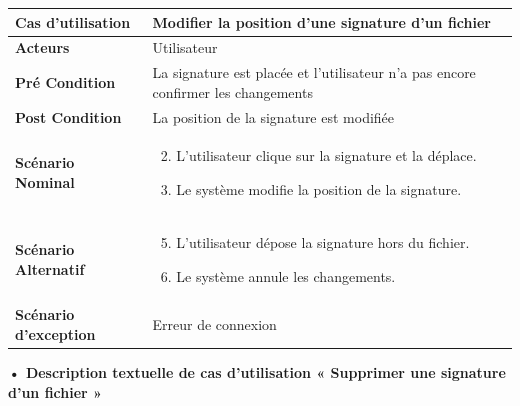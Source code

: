 \begin{longtable}{|p{5cm}|p{10cm}|}
\hline
\textbf{Cas d'utilisation}&Modifier la position d'une signature d'un fichier\\
\hline
\textbf{Acteurs}&Utilisateur\\
\hline
\textbf{Pré Condition}&La signature est placée et l'utilisateur n'a pas encore confirmer les changements\\
\hline
\textbf{Post Condition}&La position de la signature est modifiée\\
\hline
\textbf{Scénario Nominal}&
\vspace{-\baselineskip}
\begin{enumerate}
    \setcounter{enumi}{1}
    \item L'utilisateur clique sur la signature et la déplace.
    \item Le système modifie la position de la signature.
\end{enumerate}\\
\hline
\textbf{Scénario Alternatif}&
\vspace{-\baselineskip}
\begin{enumerate}
    \setcounter{enumi}{4}
    \item L'utilisateur dépose la signature hors du fichier.
    \item Le système annule les changements.
\end{enumerate}\\
\hline
\textbf{Scénario d'exception}&Erreur de connexion\\
\hline
\end{longtable}

\textbf{•	Description textuelle de cas d'utilisation « Supprimer une signature d'un fichier  »}

